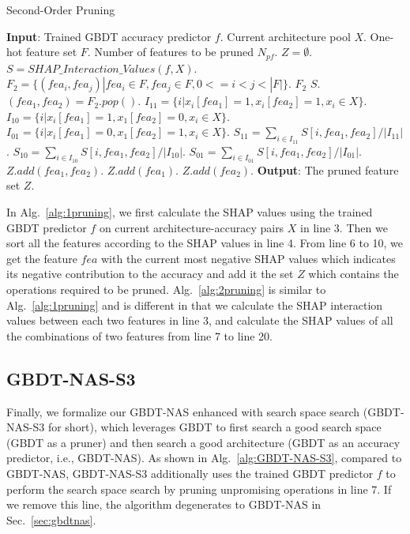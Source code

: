 \documentclass{article}
\begin{document}
\begin{algorithm}[!h]
\small
\caption{Second-Order Pruning}
\label{alg:2pruning}
\begin{algorithmic}[1]
\STATE \textbf{Input}: Trained GBDT accuracy predictor $f$. Current architecture pool $X$. One-hot feature set $F$. Number of features to be pruned $N_{pf}$.
\STATE $Z=\emptyset$.
\STATE $S = SHAP\_Interaction\_Values(f, X)$.
\STATE $F_2=\{(fea_i,fea_j)|fea_i \in F, fea_j \in F, 0<=i<j<|F|\}$.
\STATE {} $F_2$  $S$.
\STATE $(fea_1, fea_2)=F_2.pop()$.
\STATE $I_{11} = \{i|x_i[fea_1]=1,x_i[fea_2] = 1, x_i \in X\}$.
\STATE $I_{10} = \{i|x_i[fea_1]=1,x_1[fea_2] = 0, x_i \in X\}$.
\STATE $I_{01} = \{i|x_i[fea_1]=0,x_1[fea_2] = 1, x_i \in X\}$.
\STATE $S_{11} = \sum_{i\in I_{11}}S[i,fea_1,fea_2] / |I_{11}|$.
\STATE $S_{10} = \sum_{i\in I_{10}}S[i,fea_1,fea_2] / |I_{10}|$.
\STATE $S_{01} = \sum_{i\in I_{01}}S[i,fea_1,fea_2] / |I_{01}|$.
\STATE $Z.add(fea_1,fea_2)$.
\STATE $Z.add(fea_1)$.
\STATE $Z.add(fea_2)$.
\ENDIF
\ENDFOR
\STATE \textbf{Output}: The pruned feature set $Z$.
\end{algorithmic}
\end{algorithm}

In Alg.~\ref{alg:1pruning}, we first calculate the SHAP values using the trained GBDT predictor $f$ on current architecture-accuracy pairs $X$ in line 3. Then we sort all the features according to the SHAP values in line 4. From line 6 to 10, we get the feature $fea$ with the current most negative SHAP values which indicates its negative contribution to the accuracy and add it the set $Z$ which contains the operations required to be pruned. Alg.~\ref{alg:2pruning} is similar to Alg.~\ref{alg:1pruning} and is different in that we calculate the SHAP interaction values between each two features in line 3, and calculate the SHAP values of all the combinations of two features from line 7 to line 20.

\subsection{GBDT-NAS-S3}
Finally, we formalize our GBDT-NAS enhanced with search space search (GBDT-NAS-S3 for short), which leverages GBDT to first search a good search space (GBDT as a pruner) and then search a good architecture (GBDT as an accuracy predictor, i.e., GBDT-NAS). As shown in Alg.~\ref{alg:GBDT-NAS-S3}, compared to GBDT-NAS, GBDT-NAS-S3 additionally uses the trained GBDT predictor $f$ to perform the search space search by pruning unpromising operations in line 7. If we remove this line, the algorithm degenerates to GBDT-NAS in Sec.~\ref{sec:gbdtnas}.
\end{document}
